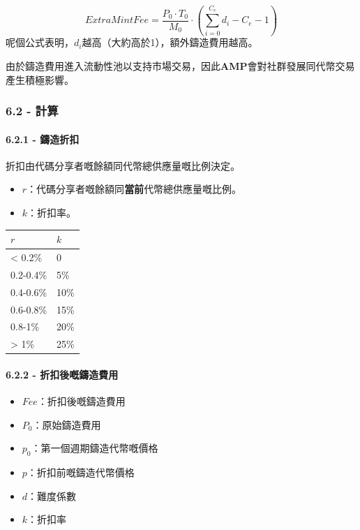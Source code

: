 \documentclass[
]{article}
\providecommand{\tightlist}{%
  \setlength{\itemsep}{0pt}\setlength{\parskip}{0pt}}
\begin{document}
\begin{equation}
ExtraMintFee = \frac{P_0 \cdot T_0}{M_0} \cdot (\sum_{i=0}^{C_e}d_i - C_e - 1)
\end{equation}
呢個公式表明，\(d_i\)越高（大約高於1），額外鑄造費用越高。

由於鑄造費用進入流動性池以支持市場交易，因此\textbf{AMP}會對社群發展同代幣交易產生積極影響。

\subsubsection{6.2 - 計算}\label{ux8a08ux7b97-1}

\paragraph{6.2.1 - 鑄造折扣}\label{ux9444ux9020ux6298ux6263}

折扣由代碼分享者嘅餘額同代幣總供應量嘅比例決定。

\begin{itemize}
\tightlist
\item
  \(r\)：代碼分享者嘅餘額同\textbf{當前}代幣總供應量嘅比例。
\item
  \(k\)：折扣率。
\end{itemize}

\begin{longtable}[]{@{}ll@{}}
\toprule\noalign{}
\(r\) & \(k\) \\
\midrule\noalign{}
\endhead
\bottomrule\noalign{}
\endlastfoot
\textless{} 0.2\% & 0 \\
0.2-0.4\% & 5\% \\
0.4-0.6\% & 10\% \\
0.6-0.8\% & 15\% \\
0.8-1\% & 20\% \\
\textgreater{} 1\% & 25\% \\
\end{longtable}

\paragraph{6.2.2 -
折扣後嘅鑄造費用}\label{ux6298ux6263ux5f8cux5605ux9444ux9020ux8cbbux7528}

\begin{itemize}
\tightlist
\item
  \(Fee\)：折扣後嘅鑄造費用
\item
  \(P_0\)：原始鑄造費用
\item
  \(p_0\)：第一個週期鑄造代幣嘅價格
\item
  \(p\)：折扣前嘅鑄造代幣價格
\item
  \(d\)：難度係數
\item
  \(k\)：折扣率
\end{itemize}
\end{document}
